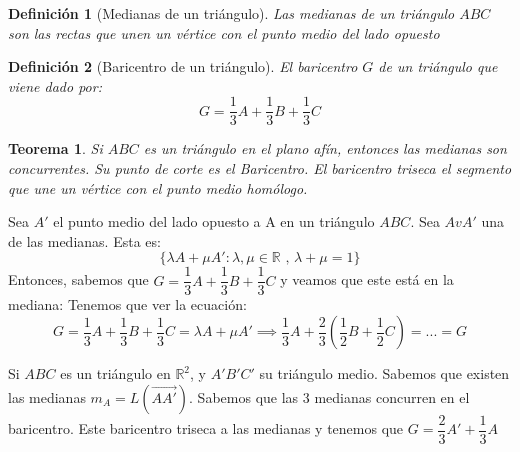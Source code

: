 \documentclass[11pt, a4paper, titlepage]{article}
\makeatletter
\renewenvironment{proof}[1][\proofname] {\vspace{-15pt}\par\pushQED{\qed}\normalfont\topsep6\p@\@plus6\p@\relax\trivlist\item[\hskip\labelsep\it#1\@addpunct{.}]\ignorespaces}{\popQED\endtrivlist\@endpefalse}
\newcommand{\R}{\mathbb{R}}
\renewcommand{\vec}{\overrightarrow}
\theoremstyle{theorem-style}
\newtheorem*{nth}{Teorema}
\theoremstyle{definition-style}
\newtheorem*{ndef}{Definición}
\theoremstyle{remark-style}
\theoremstyle{example-style}
\makeatother
\begin{document}
\begin{ndef}[Medianas de un triángulo]
  Las medianas de un triángulo $ABC$ son las rectas que unen un vértice con el punto medio del lado opuesto
\end{ndef}
\begin{ndef}[Baricentro de un triángulo]
  El baricentro $G$ de un triángulo que viene dado por:
  \[
    G = \dfrac{1}{3} A +  \dfrac{1}{3} B +  \dfrac{1}{3} C
  \]
\end{ndef}

\begin{nth}
  Si $ABC$ es un triángulo en el plano afín, entonces las medianas son concurrentes. Su punto de corte es el Baricentro. El baricentro triseca el segmento que une un vértice con el punto medio homólogo.


\end{nth}



\begin{proof}
  Sea $A'$ el punto medio del lado opuesto a A en un triángulo $ABC$. Sea $AvA'$ una de las medianas. Esta es:
  \[
    \{\lambda A + \mu A': \lambda, \mu \in \R \text{ , } \lambda+\mu = 1\}
  \]
  Entonces, sabemos que $G = \dfrac{1}{3} A +  \dfrac{1}{3} B +  \dfrac{1}{3} C$ y veamos que este está en la mediana: Tenemos que ver la ecuación:
  \[
    G = \dfrac{1}{3} A +  \dfrac{1}{3} B +  \dfrac{1}{3} C = \lambda A + \mu A'  \implies \dfrac{1}{3}A + \dfrac{2}{3}(\dfrac{1}{2}B+\dfrac{1}{2}C) = ... = G
  \]

\end{proof}

Si $ABC$ es un triángulo en $\R^2$, y $A'B'C'$ su triángulo medio. Sabemos que existen las medianas $m_A = L(\vec{AA'})$. Sabemos que las 3 medianas concurren en el baricentro. Este baricentro triseca a las medianas y tenemos que $G = \dfrac{2}{3}A' + \dfrac{1}{3}A$
\end{document}
